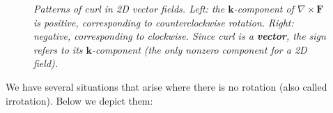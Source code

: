 \begin{figure}[H]
\caption{\textit{Patterns of curl in 2D vector fields. Left: the $\mathbf{k}$-component of $\nabla\times\mathbf{F}$ is positive, corresponding to counterclockwise rotation. Right: negative, corresponding to clockwise. Since curl is a \textbf{vector}, the sign refers to its $\mathbf{k}$-component (the only nonzero component for a 2D field).}}
\label{fig:curl_patterns}
\end{figure}

\noindent We have several situations that arise where there is no rotation (also called irrotation). Below we depict them:


